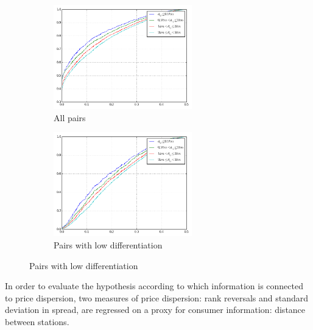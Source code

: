 \documentclass[11pt]{article}
\begin{document}
\begin{figure}[H]
\centering
\caption{Empirical distribution functions of rank reversals (raw prices)}
\begin{subfigure}{.4\linewidth}
\centering
\includegraphics[width=6cm]{graphs/ecdf_rr_all.png}
\caption[short]{All pairs}
\end{subfigure}
\begin{subfigure}{.4\linewidth}
\centering
\includegraphics[width=6cm]{graphs/ecdf_rr_nodiff.png}
\caption[short]{Pairs with low differentiation}
\end{subfigure}
\end{figure}

In order to evaluate the hypothesis according to which information is connected to price dispersion, two measures of price dispersion: rank reversals and standard deviation in spread, are regressed on a proxy for consumer information: distance between stations.
\end{document}
